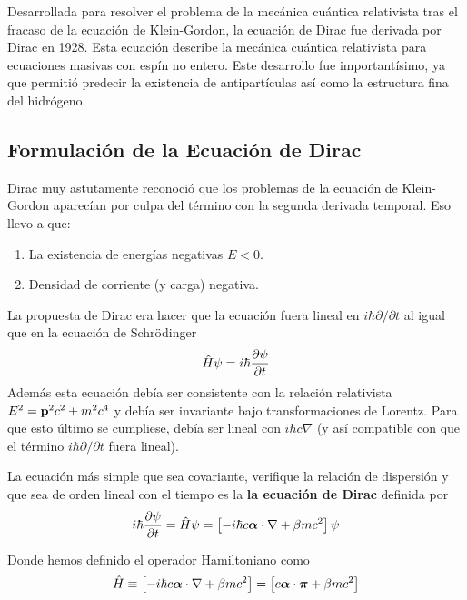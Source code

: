 Desarrollada para resolver el problema de la mecánica cuántica relativista tras el fracaso de la ecuación de Klein-Gordon, la ecuación de Dirac fue derivada por Dirac en 1928. Esta ecuación describe la mecánica cuántica relativista para ecuaciones masivas con espín no entero. Este desarrollo fue importantísimo, ya que permitió predecir la existencia de antipartículas así como la estructura fina del hidrógeno.

\subsection{Formulación de la Ecuación de Dirac}

Dirac muy astutamente reconoció que los problemas de la ecuación de Klein-Gordon aparecían por culpa del término con la segunda derivada temporal. Eso llevo a que:

\begin{enumerate}[label=\alph*)]
	\item La existencia de energías negativas $E<0$. 
	\item Densidad de corriente (y carga) negativa.
\end{enumerate}
La propuesta de Dirac era hacer que la ecuación fuera lineal en $i\hbar \partial/\partial t$ al igual que en la ecuación de Schrödinger
\begin{equation}
	\hat{H} \psi = i \hbar \frac{\partial \psi}{\partial t} 
\end{equation}
Además esta ecuación debía ser consistente con la relación relativista $E^2 = \mathbf{p}^2 c^2+ m^2 c^4$ y debía ser invariante bajo transformaciones de Lorentz. Para que esto último se cumpliese, debía ser lineal con $i\hbar c \nabla$ (y así compatible con que el término $i\hbar \partial/\partial t$ fuera lineal).


\begin{definicion}
 La ecuación más simple que sea covariante, verifique la relación de dispersión y que sea de orden lineal con el tiempo es la \textbf{la ecuación de Dirac} definida por
\begin{equation}
	i \hbar \frac{\partial \psi}{\partial t} = \hat{H} \psi = \left[ -i\hbar c \boldsymbol{\alpha} \cdot \nabla + \beta m c^2 \right]\psi \label{Ec:03-02-02}
\end{equation}
\end{definicion}
Donde hemos definido el operador Hamiltoniano como
\begin{equation}
	\hat{H} \equiv \left[ -i\hbar c \boldsymbol{\alpha} \cdot \nabla + \beta m c^2 \right] = \left[ c \boldsymbol{\alpha} \cdot \boldsymbol{\pi} + \beta mc^2 \right]
\end{equation}

